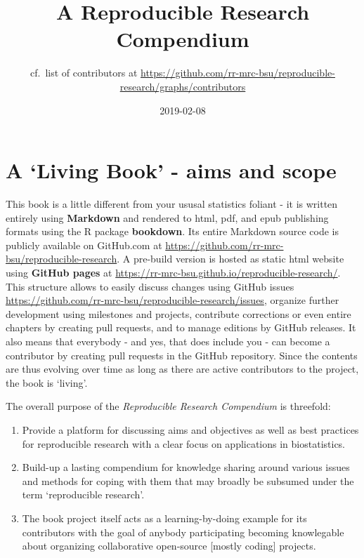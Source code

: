 \documentclass[]{book}
\title{A Reproducible Research Compendium}
\author{cf.~list of contributors at
\url{https://github.com/rr-mrc-bsu/reproducible-research/graphs/contributors}}
\date{2019-02-08}
\providecommand{\tightlist}{%
  \setlength{\itemsep}{0pt}\setlength{\parskip}{0pt}}
\begin{document}
\maketitle

{
\setcounter{tocdepth}{1}
\tableofcontents
}
\chapter{\texorpdfstring{A `Living Book' - aims and
scope}{A Living Book - aims and scope}}\label{a-living-book---aims-and-scope}

This book is a little different from your ususal statistics foliant - it
is written entirely using \textbf{Markdown} and rendered to html, pdf,
and epub publishing formats using the R package \textbf{bookdown}. Its
entire Markdown source code is publicly available on GitHub.com at
\url{https://github.com/rr-mrc-bsu/reproducible-research}. A pre-build
version is hosted as static html website using \textbf{GitHub pages} at
\url{https://rr-mrc-bsu.github.io/reproducible-research/}. This
structure allows to easily discuss changes using GitHub issues
\url{https://github.com/rr-mrc-bsu/reproducible-research/issues},
organize further development using milestones and projects, contribute
corrections or even entire chapters by creating pull requests, and to
manage editions by GitHub releases. It also means that everybody - and
yes, that does include you - can become a contributor by creating pull
requests in the GitHub repository. Since the contents are thus evolving
over time as long as there are active contributors to the project, the
book is `living'.

The overall purpose of the \emph{Reproducible Research Compendium} is
threefold:

\begin{enumerate}
\def\labelenumi{\arabic{enumi}.}
\tightlist
\item
  Provide a platform for discussing aims and objectives as well as best
  practices for reproducible research with a clear focus on applications
  in biostatistics.
\item
  Build-up a lasting compendium for knowledge sharing around various
  issues and methods for coping with them that may broadly be subsumed
  under the term `reproducible research'.
\item
  The book project itself acts as a learning-by-doing example for its
  contributors with the goal of anybody participating becoming
  knowlegable about organizing collaborative open-source {[}mostly
  coding{]} projects.
\end{enumerate}
\end{document}
